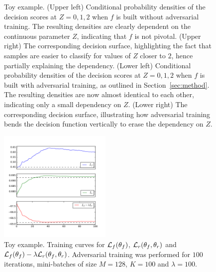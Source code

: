 \documentclass[twocolumn,superscriptaddress,aps]{revtex4-1}
\theoremstyle{plain}
\begin{document}
\begin{figure}
\begin{center}
    \end{center}
    \vspace{-1cm}
    \caption{Toy example.
    (Upper left) Conditional probability densities of the decision scores at $Z=0, 1, 2$
       when $f$ is built without adversarial training. The resulting densities
       are clearly dependent on the continuous parameter $Z$, indicating that $f$ is not pivotal.
    (Upper right) The corresponding decision surface, highlighting
       the fact that samples are easier to classify for values of $Z$ closer to $2$,
       hence partially explaining the dependency.
    (Lower left) Conditional probability densities of the decision scores at $Z=0, 1, 2$ when $f$ is
       built with adversarial training, as outlined in Section~\ref{sec:method}.
       The resulting densities are now almost identical to each other, indicating only a
       small dependency on $Z$.
    (Lower right) The corresponding decision surface, illustrating how adversarial
       training bends the decision function vertically to erase the dependency on $Z$.
    }
    \label{fig:toy}
\end{figure}

\begin{figure}
    \includegraphics[width=0.48\textwidth]{figures/training.pdf}
    \vspace{-1cm}
    \caption{Toy example. Training curves for ${\cal L}_f(\theta_f)$, ${\cal L}_r(\theta_f, \theta_r)$
             and ${\cal L}_f(\theta_f) - \lambda {\cal L}_r(\theta_f, \theta_r)$.
             Adversarial training was performed for $100$ iterations, mini-batches of size $M=128$, $K=100$ and $\lambda=100$.}
    \label{fig:toy-training}
\end{figure}
\end{document}
